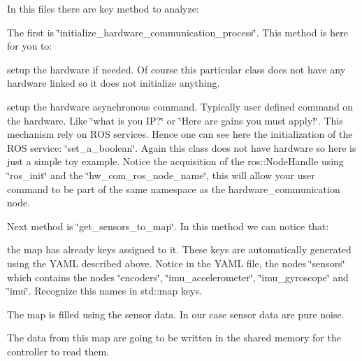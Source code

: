 In this files there are key method to analyze\+:

The first is \char`\"{}initialize\+\_\+hardware\+\_\+communication\+\_\+process\char`\"{}.  This method is here for you to\+:
\begin{DoxyItemize}
\item setup the hardware if needed. Of course this particular class does not have any hardware linked so it does not initialize anything.
\item setup the hardware asynchronous command. Typically user defined command on the hardware. Like \char`\"{}what is you I\+P?\char`\"{} or \char`\"{}\+Here are gains you must apply!\char`\"{}. This mechanism rely on R\+OS services. Hence one can see here the initialization of the R\+OS service\+: \char`\"{}set\+\_\+a\+\_\+boolean\char`\"{}. Again this class does not have hardware so here is just a simple toy example. Notice the acquisition of the ros\+::\+Node\+Handle using \char`\"{}ros\+\_\+init\char`\"{} and the \char`\"{}hw\+\_\+com\+\_\+ros\+\_\+node\+\_\+name\char`\"{}, this will allow your user command to be part of the same namespace as the hardware\+\_\+communication node.
\end{DoxyItemize}

Next method is \char`\"{}get\+\_\+sensors\+\_\+to\+\_\+map\char`\"{}.  In this method we can notice that\+:
\begin{DoxyItemize}
\item the map has already keys assigned to it. These keys are automatically generated using the Y\+A\+ML described above. Notice in the Y\+A\+ML file, the nodes \char`\"{}sensors\char`\"{} which contains the nodes \char`\"{}encoders\char`\"{}, \char`\"{}imu\+\_\+accelerometer\char`\"{}, \char`\"{}imu\+\_\+gyroscope\char`\"{} and \char`\"{}imu\char`\"{}. Recognize this names in std\+::map keys.
\item The map is filled using the sensor data. In our case sensor data are pure noise.
\item The data from this map are going to be written in the shared memory for the controller to read them.
\end{DoxyItemize}

